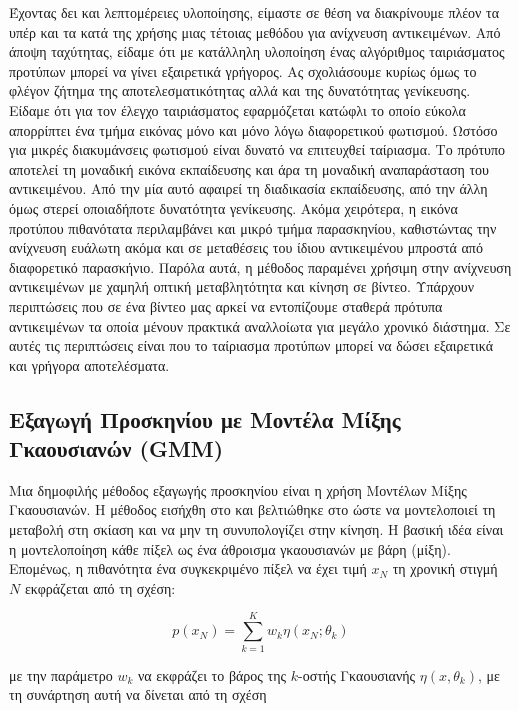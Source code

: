 \documentclass[11pt,a4paper,english,greek,twoside]{../Thesis}
\begin{document}
\par Έχοντας δει και λεπτομέρειες υλοποίησης, είμαστε σε θέση να διακρίνουμε πλέον τα υπέρ και τα κατά της χρήσης μιας τέτοιας μεθόδου για ανίχνευση αντικειμένων. Από άποψη ταχύτητας, είδαμε ότι με κατάλληλη υλοποίηση ένας αλγόριθμος ταιριάσματος προτύπων μπορεί να γίνει εξαιρετικά γρήγορος. Ας σχολιάσουμε κυρίως όμως το φλέγον ζήτημα της αποτελεσματικότητας αλλά και της δυνατότητας γενίκευσης. Είδαμε ότι για τον έλεγχο ταιριάσματος εφαρμόζεται κατώφλι το οποίο εύκολα απορρίπτει ένα τμήμα εικόνας μόνο και μόνο λόγω διαφορετικού φωτισμού. Ωστόσο για μικρές διακυμάνσεις φωτισμού είναι δυνατό να επιτευχθεί ταίριασμα. Το πρότυπο αποτελεί τη μοναδική εικόνα εκπαίδευσης και άρα τη μοναδική αναπαράσταση του αντικειμένου. Από την μία αυτό αφαιρεί τη διαδικασία εκπαίδευσης, από την άλλη όμως στερεί οποιαδήποτε δυνατότητα γενίκευσης. Ακόμα χειρότερα, η εικόνα προτύπου πιθανότατα περιλαμβάνει και μικρό τμήμα παρασκηνίου, καθιστώντας την ανίχνευση ευάλωτη ακόμα και σε μεταθέσεις του ίδιου αντικειμένου μπροστά από διαφορετικό παρασκήνιο. Παρόλα αυτά, η μέθοδος παραμένει χρήσιμη στην ανίχνευση αντικειμένων με χαμηλή οπτική μεταβλητότητα και κίνηση σε βίντεο. Υπάρχουν περιπτώσεις που σε ένα βίντεο μας αρκεί να εντοπίζουμε σταθερά πρότυπα αντικειμένων τα οποία μένουν πρακτικά αναλλοίωτα για μεγάλο χρονικό διάστημα. Σε αυτές τις περιπτώσεις είναι που το ταίριασμα προτύπων μπορεί να δώσει εξαιρετικά και γρήγορα αποτελέσματα.

\subsection{Εξαγωγή Προσκηνίου με Μοντέλα Μίξης Γκαουσιανών (GMM)}
Μια δημοφιλής μέθοδος εξαγωγής προσκηνίου είναι η χρήση Μοντέλων Μίξης Γκαουσιανών. Η μέθοδος εισήχθη στο \cite{stauffer_1999} και βελτιώθηκε στο \cite{kaewtrakulpong_2002} ώστε να μοντελοποιεί τη μεταβολή στη σκίαση και να μην τη συνυπολογίζει στην κίνηση. Η βασική ιδέα είναι η μοντελοποίηση κάθε πίξελ ως ένα άθροισμα γκαουσιανών με βάρη (μίξη). Επομένως, η πιθανότητα ένα συγκεκριμένο πίξελ να έχει τιμή $x_N$ τη χρονική στιγμή $N$ εκφράζεται από τη σχέση:

\begin{equation}\label{eq:GMM}
    p(x_N)=\sum_{k=1}^{K} w_k \eta(x_N; \theta_{k})
\end{equation}

με την παράμετρο $w_k$ να εκφράζει το βάρος της $k$-οστής Γκαουσιανής $\eta(x,\theta_{k})$, με τη συνάρτηση αυτή να δίνεται από τη σχέση
\end{document}
